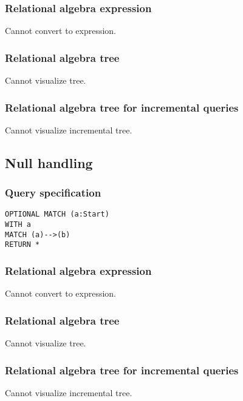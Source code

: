 \subsubsection*{Relational algebra expression}

Cannot convert to expression.

\subsubsection*{Relational algebra tree}

Cannot visualize tree.

\subsubsection*{Relational algebra tree for incremental queries}

Cannot visualize incremental tree.

\subsection{Null handling}

\subsubsection*{Query specification}

\begin{lstlisting}
OPTIONAL MATCH (a:Start)
WITH a
MATCH (a)-->(b)
RETURN *
\end{lstlisting}

\subsubsection*{Relational algebra expression}

Cannot convert to expression.

\subsubsection*{Relational algebra tree}

Cannot visualize tree.

\subsubsection*{Relational algebra tree for incremental queries}

Cannot visualize incremental tree.

